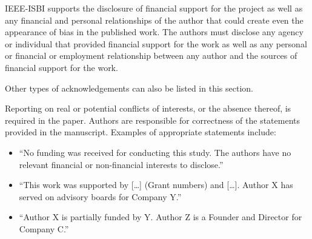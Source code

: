 \documentclass{article}
\begin{document}
IEEE-ISBI supports the disclosure of financial support for the project
as well as any financial and personal relationships of the author that
could create even the appearance of bias in the published work. The
authors must disclose any agency or individual that provided financial
support for the work as well as any personal or financial or
employment relationship between any author and the sources of
financial support for the work.

Other types of acknowledgements can also be listed in this section.

Reporting on real or potential conflicts of interests, or the absence
thereof, is required in the paper. Authors are responsible for
correctness of the statements provided in the manuscript. Examples of
appropriate statements include:
\begin{itemize}
  \item ``No funding was received for conducting this study. The
    authors have no relevant financial or non-financial interests to
    disclose.'' 
  \item ``This work was supported by […] (Grant numbers) and
    […]. Author X has served on advisory boards for Company Y.'' 
  \item ``Author X is partially funded by Y. Author Z is a Founder and
    Director for Company C.''
\end{itemize}



\end{document}
